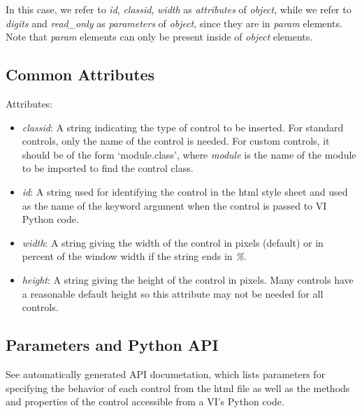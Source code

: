 \documentclass[letterpaper,10pt,english]{sphinxmanual}
\begin{document}
In this case, we refer to \emph{id}, \emph{classid}, \emph{width} as \emph{attributes} of \emph{object},
while we refer to \emph{digits} and \emph{read\_only} as \emph{parameters} of \emph{object}, since
they are in \emph{param} elements. Note that \emph{param} elements can only be present
inside of \emph{object} elements.


\subsection{Common Attributes}
\label{programming:common-attributes}
Attributes:
\begin{itemize}
\item {} 
\emph{classid}: A string indicating the type of control to be inserted. For
standard controls, only the name of the control is needed. For custom
controls, it should be of the form `module.class', where \emph{module} is the name
of the module to be imported to find the control class.

\item {} 
\emph{id}: A string used for identifying the control in the html style sheet and
used as the name of the keyword argument when the control is passed to VI
Python code.

\item {} 
\emph{width}: A string giving the width of the control in pixels (default) or in
percent of the window width if the string ends in \emph{\%}.

\item {} 
\emph{height}: A string giving the height of the control in pixels. Many controls
have a reasonable default height so this attribute may not be needed for all
controls.

\end{itemize}


\subsection{Parameters and Python API}
\label{programming:parameters-and-python-api}
See automatically generated API documetation, which lists parameters for
specifying the behavior of each control from the html file as well as the
methods and properties of the control accessible from a VI's Python code.
\end{document}
